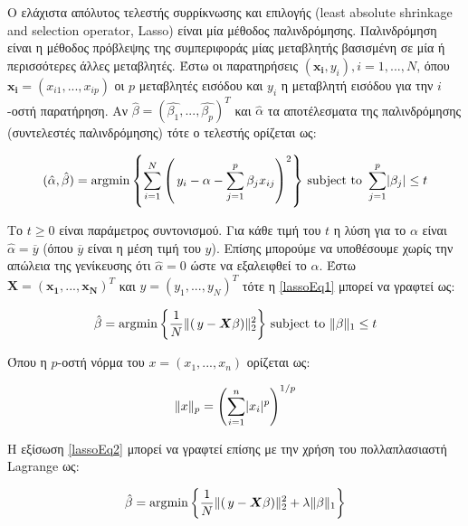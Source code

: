 \documentclass[a4paper,12pt]{article}
\DeclareMathOperator*{\argmin}{\arg\!\min}
\DeclarePairedDelimiter\abs{\lvert}{\rvert}
\DeclarePairedDelimiter\norm{\lVert}{\rVert}
\begin{document}
Ο ελάχιστα απόλυτος τελεστής συρρίκνωσης και επιλογής (least absolute shrinkage
and selection operator, Lasso) \cite{Lasso:1} είναι μία μέθοδος παλινδρόμησης.
Παλινδρόμηση είναι η μέθοδος πρόβλεψης της συμπεριφοράς μίας μεταβλητής
βασισμένη σε μία ή περισσότερες άλλες μεταβλητές. Έστω οι παρατηρήσεις
$(\bm{x_i},y_i), i=1,...,N$, όπου $\bm{x_i}=(x_{i1},...,x_{ip})$ οι $p$
μεταβλητές εισόδου και $y_i$ η μεταβλητή εισόδου για την $i$-οστή παρατήρηση. Αν
$\hat{\beta} = (\hat{{\beta}_1},...,\hat{{\beta}_p})^T$ και $\hat{\alpha}$ τα
αποτέλεσματα της παλινδρόμησης (συντελεστές παλινδρόμησης) τότε ο τελεστής
ορίζεται ως:

\begin{equation}\label{lassoEq1}
    (\hat{\alpha}, \hat{\beta}) = 
    \argmin{\left\{\sum_{i=1}^{N} {\left(\,y_i-\alpha- \sum_{j=1}^{p}
    \beta_{j}x_{ij}\right)}^2 \right\}} 
    \text{ subject to }
    \sum_{j=1}^{p} \abs{\beta_j} \leq t
\end{equation}

Το $t \geq 0$ είναι παράμετρος συντονισμού. Για κάθε τιμή του $t$ η λύση για το
$\alpha$ είναι $\hat{\alpha}=\overline{y}$ (όπου $\overline{y}$ είναι η μέση
τιμή του $y$). Επίσης μπορούμε να υποθέσουμε χωρίς την απώλεια της γενίκευσης
ότι $\hat{\alpha}=0$ ώστε να εξαλειφθεί το $\alpha$. Έστω $\bm{X} =
(\bm{x_1},...,\bm{x_N})^T$ και $y = (y_1,...,y_N)^T$ τότε η \eqref{lassoEq1}
μπορεί να γραφτεί ως:

\begin{equation}\label{lassoEq2}
    \hat{\beta} = 
    \argmin{\left\{\frac{1}{N} \norm{\left(\,y - \bm{X} \beta\right)}_2^2
    \right\}} 
    \text{ subject to }
    \norm{\beta}_1 \leq t
\end{equation}

Όπου η $p$-οστή νόρμα του $x=(x_1,...,x_n)$ ορίζεται ως:

\begin{equation*}
    \norm{x}_p=\left( \sum_{i=1}^{n} \abs{x_i}^p\right)^{1/p}
\end{equation*}

Η εξίσωση \eqref{lassoEq2} μπορεί να γραφτεί επίσης με την χρήση του
πολλαπλασιαστή Lagrange ως:

\begin{equation}\label{lassoEq3}
    \hat{\beta} = 
    \argmin{\left\{\frac{1}{N} \norm{\left(\,y - \bm{X} \beta\right)}_2^2 +
    \lambda \norm{\beta}_1 \right\}} 
\end{equation}
\end{document}
